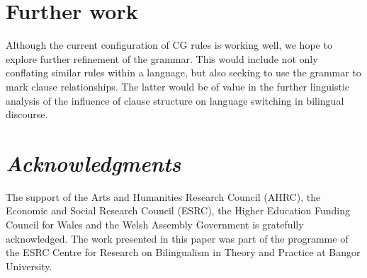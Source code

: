 \documentclass[11pt]{article}
\begin{document}
\section{Further work}
\label{sec:further}


Although the current configuration of CG rules is working well, we hope to explore further refinement of the grammar.  This would include not only conflating similar rules within a language, but also seeking to use the grammar to mark clause relationships.  The latter would be of value in the further linguistic analysis of the influence of clause structure on language switching in bilingual discourse.


\section*{\textit{Acknowledgments}}

The support of the Arts and Humanities Research Council (AHRC), the Economic and Social Research Council (ESRC), the Higher Education Funding Council for Wales and the Welsh Assembly Government is gratefully acknowledged. The work presented in this paper was part of the programme of the ESRC Centre for Research on Bilingualism in Theory and Practice at Bangor University.




\end{document}
